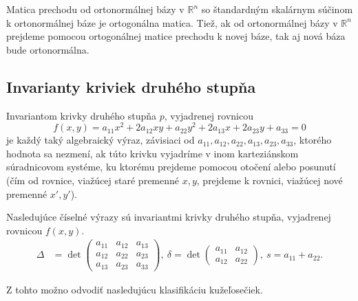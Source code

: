 \begin{theorem} 
Matica prechodu od ortonormálnej bázy v $\mathbb{R}^n$ so štandardným skalárnym súčinom k ortonormálnej báze je ortogonálna matica. Tiež, ak od ortonormálnej bázy v $\mathbb{R}^n$ prejdeme pomocou ortogonálnej matice prechodu k novej báze,
tak aj nová báza bude ortonormálna.
\end{theorem}

\subsection{Invarianty kriviek druhého stupňa}
\begin{definition}
Invariantom krivky druhého stupňa $p$, vyjadrenej rovnicou
$$
f(x, y) = a_{11}x^2 + 2a_{12}xy + a_{22}y^2 + 2a_{13}x + 2a_{23}y + a_{33} = 0
$$
je každý taký algebraický výraz, závisiaci od \(a_{11}, a_{12}, a_{22}, a_{13}, a_{23}, a_{33}\), ktorého hodnota sa nezmení, ak túto krivku vyjadríme v inom karteziánskom súradnicovom systéme, ku ktorému prejdeme pomocou otočení alebo posunutí (čím od rovnice, viažúcej staré premenné \(x, y\), prejdeme k rovnici, viažúcej nové premenné \(x', y'\)).
\end{definition}

\begin{theorem}
Nasledujúce číselné výrazy sú invariantmi krivky druhého stupňa, vyjadrenej rovnicou $f(x, y)$.
\begin{align*}
\Delta &= \det \begin{pmatrix} 
a_{11} & a_{12} & a_{13} \\ 
a_{12} & a_{22} & a_{23} \\
a_{13} & a_{23} & a_{33} \end{pmatrix}, \
\delta = \det \begin{pmatrix} a_{11} & a_{12} \\ a_{12} & a_{22} \end{pmatrix}, \
s = a_{11} + a_{22}.
\end{align*}
\end{theorem}
Z tohto možno odvodiť nasledujúcu klasifikáciu kužeľosečiek.


